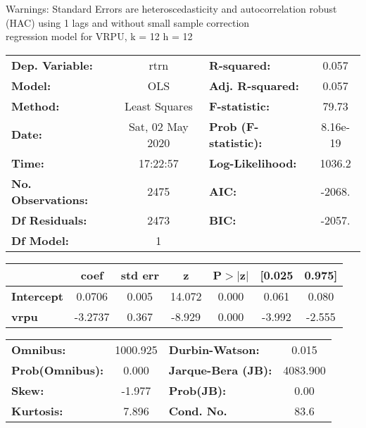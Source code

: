 Warnings: \newline
 [1] Standard Errors are heteroscedasticity and autocorrelation robust (HAC) using 1 lags and without small sample correction\\ 

regression model for VRPU, k = 12 h = 12\begin{center}
\begin{tabular}{lclc}
\toprule
\textbf{Dep. Variable:}    &       rtrn       & \textbf{  R-squared:         } &     0.057   \\
\textbf{Model:}            &       OLS        & \textbf{  Adj. R-squared:    } &     0.057   \\
\textbf{Method:}           &  Least Squares   & \textbf{  F-statistic:       } &     79.73   \\
\textbf{Date:}             & Sat, 02 May 2020 & \textbf{  Prob (F-statistic):} &  8.16e-19   \\
\textbf{Time:}             &     17:22:57     & \textbf{  Log-Likelihood:    } &    1036.2   \\
\textbf{No. Observations:} &        2475      & \textbf{  AIC:               } &    -2068.   \\
\textbf{Df Residuals:}     &        2473      & \textbf{  BIC:               } &    -2057.   \\
\textbf{Df Model:}         &           1      & \textbf{                     } &             \\
\bottomrule
\end{tabular}
\begin{tabular}{lcccccc}
                   & \textbf{coef} & \textbf{std err} & \textbf{z} & \textbf{P$> |$z$|$} & \textbf{[0.025} & \textbf{0.975]}  \\
\midrule
\textbf{Intercept} &       0.0706  &        0.005     &    14.072  &         0.000        &        0.061    &        0.080     \\
\textbf{vrpu}      &      -3.2737  &        0.367     &    -8.929  &         0.000        &       -3.992    &       -2.555     \\
\bottomrule
\end{tabular}
\begin{tabular}{lclc}
\textbf{Omnibus:}       & 1000.925 & \textbf{  Durbin-Watson:     } &    0.015  \\
\textbf{Prob(Omnibus):} &   0.000  & \textbf{  Jarque-Bera (JB):  } & 4083.900  \\
\textbf{Skew:}          &  -1.977  & \textbf{  Prob(JB):          } &     0.00  \\
\textbf{Kurtosis:}      &   7.896  & \textbf{  Cond. No.          } &     83.6  \\
\bottomrule
\end{tabular}
\end{center}

